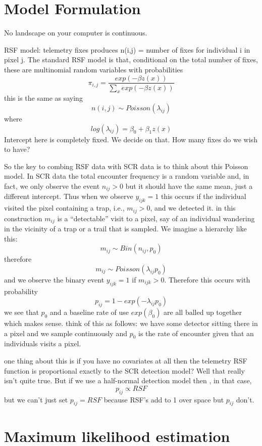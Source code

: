 \section{Model Formulation}

No landscape on your computer is continuous.

RSF model:
 telemetry fixes produces n(i,j) = number of fixes for individual i in
 pixel j.  The standard RSF model is that, conditional on the total
 number of fixes, these are multinomial random variables with
 probabilities
\[
 \pi_{i,j} = \frac{ exp( -\beta z(x) ) }{ \sum_{x} exp(-\beta z(x))} 
\]
this is the same as saying
\[
 n(i,j) \sim Poisson( \lambda_{ij})
\]
where
\[
 log(\lambda_{ij}) = \beta_{0}  + \beta_{1} z(x)
\]
Intercept here is completely fixed. We decide on that. How many fixes
do we wish to have?



So the key to combing RSF data with SCR data is to think about this
Poisson model. In SCR data the total encounter frequency is a random
variable and, in fact, we only observe the event $n_{ij}>0$ but it
should have the same mean, just a different intercept. Thus when we
observe $y_{ijk} = 1$ this occurs if the individual visited the pixel
containing a trap, i.e.,  $m_{ij}>0$, and we detected it. in this
construction $m_{ij}$ is a ``detectable'' visit to a pixel, say of an
individual wandering in the vicinity of a trap or a trail that is
sampled. 
We imagine a hierarchy like this:
\[
m_{ij} \sim Bin(n_{ij}, p_{0})
\]
therefore
\[
m_{ij} \sim Poisson( \lambda_{ij} p_{0} )
\]
and
we observe the binary event $y_{ijk} = 1$ if $m_{ijk}>0$. Therefore 
this occurs with probability 
\[
 p_{ij} = 1-exp(- \lambda_{ij} p_{0} ) 
\]
we see that $p_{0}$ and a baseline rate of use  $exp(\beta_{0})$ are
all balled up together which makes sense. 
think of this as follows: we have some detector sitting there in a
pixel and we sample continuously and $p_{0}$ is the rate of encounter
given that an individuals visits a pixel. 




one thing about this is if you have no covariates at all then
the telemetry RSF function is proportional exactly to the SCR 
detection model? Well that really isn't quite true. But if 
we use a half-normal detection model then , in that case, 
\[
p_{ij} \propto RSF
\]
but we can't just set $p_{ij} = RSF$ because RSF's add to 1 over space
but $p_{ij}$ don't. 



\section{Maximum likelihood estimation}
\label{sec.mle}

